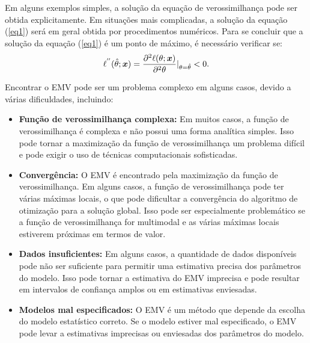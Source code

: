 \documentclass[12pt]{beamer}
\begin{document}
\begin{frame}{}
    \begin{block}{}
    \justifying
Em alguns exemplos simples, a solução da equação de verossimilhança pode ser obtida explicitamente. Em situações mais complicadas, a solução da equação (\ref{eq1}) será em geral obtida por procedimentos numéricos. Para se concluir que a solução da equação (\ref{eq1}) é um ponto de máximo, é necessário verificar se:
\begin{align}\label{eq1}
    \ell^{''}(\hat{\theta};\boldsymbol{x})=\dfrac{\partial^{2} \ell(\theta;\boldsymbol{x})}{\partial^{2} \theta}|_{\theta=\hat{\theta}}<0.
\end{align}
\end{block}
\end{frame}

\begin{frame}{}
\begin{block}{}
\justifying
Encontrar o EMV pode ser um problema complexo em alguns casos, devido a várias dificuldades, incluindo:

\begin{itemize}
\justifying
    \item \textbf{Função de verossimilhança complexa:} Em muitos casos, a função de verossimilhança é complexa e não possui uma forma analítica simples. Isso pode tornar a maximização da função de verossimilhança um problema difícil e pode exigir o uso de técnicas computacionais sofisticadas.\pause

    \item \textbf{Convergência:} O EMV é encontrado pela maximização da função de verossimilhança. Em alguns casos, a função de verossimilhança pode ter várias máximas locais, o que pode dificultar a convergência do algoritmo de otimização para a solução global. Isso pode ser especialmente problemático se a função de verossimilhança for multimodal e as várias máximas locais estiverem próximas em termos de valor.
\end{itemize}
\end{block}
\end{frame}

\begin{frame}{}
\begin{block}{}
\begin{itemize}
\justifying
    \item \textbf{Dados insuficientes:} Em alguns casos, a quantidade de dados disponíveis pode não ser suficiente para permitir uma estimativa precisa dos parâmetros do modelo. Isso pode tornar a estimativa do EMV imprecisa e pode resultar em intervalos de confiança amplos ou em estimativas enviesadas.\pause

    \item \textbf{Modelos mal especificados:} O EMV é um método que depende da escolha do modelo estatístico correto. Se o modelo estiver mal especificado, o EMV pode levar a estimativas imprecisas ou enviesadas dos parâmetros do modelo.
\end{itemize}
\end{block}
\end{frame}
\end{document}
